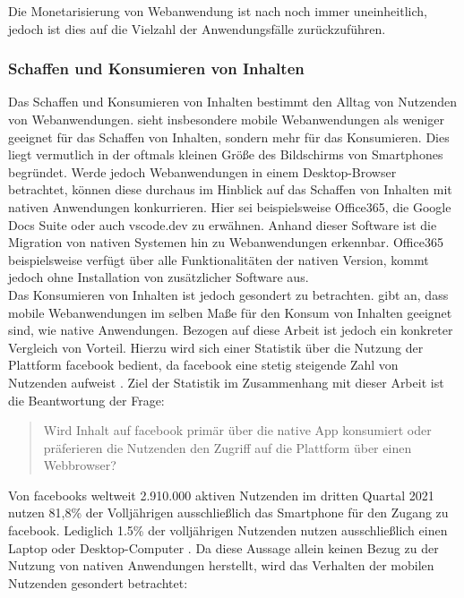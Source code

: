 \documentclass[a4paper]{scrartcl}
\begin{document}
Die Monetarisierung von Webanwendung ist nach \textcite[28]{Jobe} noch immer uneinheitlich, jedoch ist dies auf die Vielzahl der Anwendungsfälle zurückzuführen.

\subsubsection{Schaffen und Konsumieren von Inhalten}

Das Schaffen und Konsumieren von Inhalten bestimmt den Alltag von Nutzenden von Webanwendungen. \textcite[28]{Jobe} sieht insbesondere mobile Webanwendungen als weniger geeignet für das Schaffen von Inhalten, sondern mehr für das Konsumieren. Dies liegt vermutlich in der oftmals kleinen Größe des Bildschirms von Smartphones begründet. Werde jedoch Webanwendungen in einem Desktop-Browser betrachtet, können diese durchaus im Hinblick auf das Schaffen von Inhalten mit nativen Anwendungen konkurrieren. Hier sei beispielsweise Office365, die Google Docs Suite oder auch vscode.dev zu erwähnen. Anhand dieser Software ist die Migration von nativen Systemen hin zu Webanwendungen erkennbar. Office365 beispielsweise verfügt über alle Funktionalitäten der nativen Version, kommt jedoch ohne Installation von zusätzlicher Software aus. \\

Das Konsumieren von Inhalten ist jedoch gesondert zu betrachten. \textcite[28]{Jobe} gibt an, dass mobile Webanwendungen im selben Maße für den Konsum von Inhalten geeignet sind, wie native Anwendungen. Bezogen auf diese Arbeit ist jedoch ein konkreter Vergleich von Vorteil. Hierzu wird sich einer Statistik über die Nutzung der Plattform facebook bedient, da facebook eine stetig steigende Zahl von Nutzenden aufweist \autocite{Statista_Facebook}. Ziel der Statistik im Zusammenhang mit dieser Arbeit ist die Beantwortung der Frage: 
\begin{quote}
	Wird Inhalt auf facebook primär über die native App konsumiert oder präferieren die Nutzenden den Zugriff auf die Plattform über einen Webbrowser?
\end{quote}

Von facebooks weltweit 2.910.000 aktiven Nutzenden im dritten Quartal 2021 \textcite{Statista_Facebook} nutzen 81,8\% der Volljährigen ausschließlich das Smartphone für den Zugang zu facebook. Lediglich 1.5\% der volljährigen Nutzenden nutzen ausschließlich einen Laptop oder Desktop-Computer \textcite{Kemp_Facebook}. Da diese Aussage allein keinen Bezug zu der Nutzung von nativen Anwendungen herstellt, wird das Verhalten der mobilen Nutzenden gesondert betrachtet: 
\end{document}
